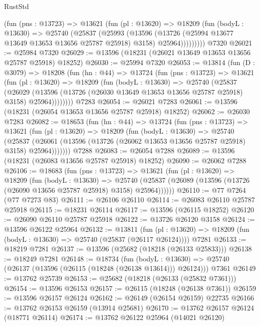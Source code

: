 \begin{lexlean}{RustStd}
\begin{coremodule}
          (fun (pns : @13723) =>
          @13621
            (fun (pl : @13620) =>
            @18209
              (fun (bodyL : @13630) =>
              @25740
                (@25837
                  (@25993
                    (@13596
                      (@13726 (@25994 @13677 @13649 @13653 @13656 @25787 @25918) @3158)
                      @25964)))))))))
    @7320
@26021 := @25984 @7320
@26029 := @13596 (@18231 (@26021 @13649 @13653 @13656 @25787 @25918) @18252)
@26030 := @25994 @7320
@26053 := @13814
    (fun (D : @3079) =>
    @18208
      (fun (hn : @44) =>
      @13724
        (fun (pns : @13723) =>
        @13621
          (fun (pl : @13620) =>
          @18209
            (fun (bodyL : @13630) =>
            @25740
              (@25837
                (@26029
                  (@13596 (@13726 (@26030 @13649 @13653 @13656 @25787 @25918) @3158) @25964))))))))
    @7283
@26054 := @26021 @7283
@26061 := @13596 (@18231 (@26054 @13653 @13656 @25787 @25918) @18252)
@26062 := @26030 @7283
@26082 := @18653
    (fun (hn : @44) =>
    @13724
      (fun (pns : @13723) =>
      @13621
        (fun (pl : @13620) =>
        @18209
          (fun (bodyL : @13630) =>
          @25740
            (@25837
              (@26061 (@13596 (@13726 (@26062 @13653 @13656 @25787 @25918) @3158) @25964)))))))
    @7288
@26083 := @26054 @7288
@26089 := @13596 (@18231 (@26083 @13656 @25787 @25918) @18252)
@26090 := @26062 @7288
@26106 := @18683
    (fun (pns : @13723) =>
    @13621
      (fun (pl : @13620) =>
      @18209
        (fun (bodyL : @13630) =>
        @25740 (@25837 (@26089 (@13596 (@13726 (@26090 @13656 @25787 @25918) @3158) @25964))))))
@26110 := @77 @7264 (@77 @7273 @83)
@26111 := @26106 @26110
@26114 := @26083 @26110 @25787 @25918
@26115 := @18231 @26114
@26117 := @13596 (@26115 @18252)
@26120 := @26090 @26110 @25787 @25918
@26122 := @13726 @26120 @3158
@26124 := @13596 @26122 @25964
@26132 := @13811
    (fun (pl : @13620) => @18209 (fun (bodyL : @13630) => @25740 (@25837 (@26117 @26124))))
    @7281
@26133 := @18219 @7281
@26137 := @13596 (@25682 (@18218 (@26133 @25833)))
@26138 := @18249 @7281
@26148 := @18734
    (fun (bodyL : @13630) => @25740 (@26137 (@13596 (@26115 (@18248 (@26138 @13614))) @26124)))
    @7361
@26149 := @13762 @25739
@26153 := @25682 (@18218 (@26133 (@25832 @7361)))
@26154 := @13596 @26153
@26157 := @26115 (@18248 (@26138 @7361))
@26159 := @13596 @26157 @26124
@26162 := @26149 (@26154 @26159) @22735
@26166 := @13762 @26153 @26159 (@13914 @25681)
@26170 := @13762 @26157 @26124 (@18771 @26114)
@26174 := @13762 @26122 @25964 (@14021 @26120)

\end{coremodule}
\end{lexlean}
